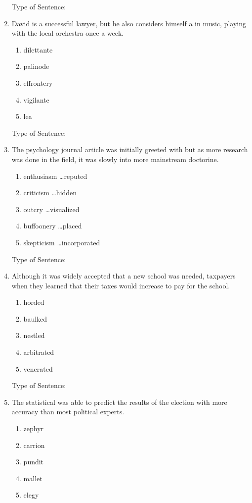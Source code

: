\begin{enumerate}
Type of Sentence:\hrulefill

\bigskip
\item David is a successful lawyer, but he also considers himself a \longline in music, playing with the local orchestra once a week. 
\begin{enumerate}[label=(\Alph*)]
\item dilettante 
\item palinode
\item effrontery
\item vigilante 
\item lea
\end{enumerate}

Type of Sentence:\hrulefill

\bigskip
\item The psychology journal article was initially greeted with \longline but as more research was done in the field, it was slowly \longline into more mainstream doctorine. 
\begin{enumerate}[label=(\Alph*)]
\item enthusiasm \ldots reputed
\item criticism \ldots hidden 
\item outcry \ldots visualized 
\item buffoonery \ldots placed
\item skepticism \ldots incorporated
\end{enumerate}

Type of Sentence:\hrulefill

\bigskip
\item Although it was widely accepted that a new school was needed, taxpayers \longline when they learned that their taxes would increase to pay for the school.
\begin{enumerate}[label=(\Alph*)]
\item horded 
\item baulked
\item nestled 
\item arbitrated 
\item venerated 
\end{enumerate}

Type of Sentence:\hrulefill

\bigskip
\item The statistical \longline was able to predict the results of the election with more accuracy than most political experts. 
\begin{enumerate}[label=(\Alph*)]
\item zephyr
\item carrion
\item pundit
\item mallet
\item elegy
\end{enumerate}


\end{enumerate}
